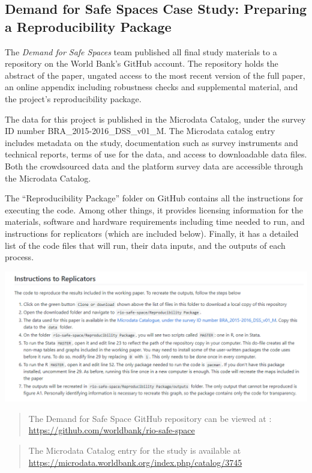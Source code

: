 \documentclass[
]{book}
\begin{document}
\begin{ex}
\hypertarget{demand-for-safe-spaces-case-study-preparing-a-reproducibility-package}{%
\subsection{Demand for Safe Spaces Case Study: Preparing a Reproducibility Package}\label{demand-for-safe-spaces-case-study-preparing-a-reproducibility-package}}

The \emph{Demand for Safe Spaces} team published all final study materials to a repository on the World Bank's GitHub account. The repository holds the abstract of the paper, ungated access to the most recent version of the full paper, an online appendix including robustness checks and supplemental material, and the project's reproducibility package.

The data for this project is published in the Microdata Catalog, under the survey ID number BRA\_2015-2016\_DSS\_v01\_M. The Microdata catalog entry includes metadata on the study, documentation such as survey instruments and technical reports, terms of use for the data, and access to downloadable data files. Both the crowdsourced data and the platform survey data are accessible through the Microdata Catalog.

The ``Reproducibility Package'' folder on GitHub contains all the instructions for executing the code. Among other things, it provides licensing information for the materials, software and hardware requirements including time needed to run, and instructions for replicators (which are included below). Finally, it has a detailed list of the code files that will run, their data inputs, and the outputs of each process.

\includegraphics{examples/rep-package.png}

\begin{quote}
The Demand for Safe Space GitHub repository can be viewed at : \url{https://github.com/worldbank/rio-safe-space}
\end{quote}

\begin{quote}
The Microdata Catalog entry for the study is available at \url{https://microdata.worldbank.org/index.php/catalog/3745}
\end{quote}
\end{ex}
\end{document}
